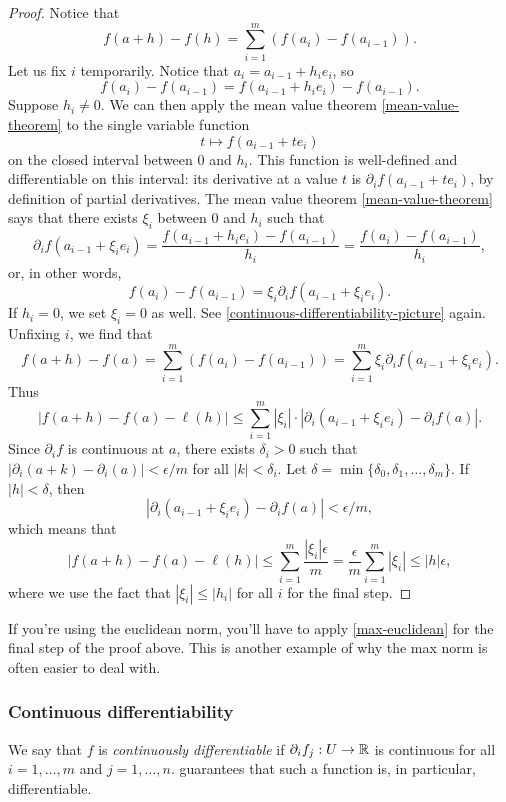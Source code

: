 \begin{proof}[Proof]
	Notice that 
	\[ f(a+h) - f(h) = \sum_{i = 1}^m \left( f(a_i) - f(a_{i-1}) \right). \]
	Let us fix $i$ temporarily. Notice that $a_i = a_{i-1} + h_i e_i$, so
	\[ f(a_i) - f(a_{i-1}) = f(a_{i-1}+h_ie_i) - f(a_{i-1}). \]
	Suppose $h_i \neq 0$. We can then apply the mean value theorem \ref{mean-value-theorem} to the single variable function \[ t \mapsto f(a_{i-1} + te_i) \] on the closed interval between $0$ and $h_i$. This function is well-defined and differentiable on this interval: its derivative at a value $t$ is $\partial_i f(a_{i-1} + te_i)$, by definition of partial derivatives. The mean value theorem \ref{mean-value-theorem} says that there exists $\xi_i$ between 0 and $h_i$ such that
	\[ \partial_i f(a_{i-1} + \xi_ie_i) = \frac{f(a_{i-1} + h_ie_i) - f(a_{i-1})}{h_i} = \frac{f(a_{i}) - f(a_{i-1})}{h_i}, \]
	or, in other words,
	\[ f(a_i) - f(a_{i-1}) = \xi_i \partial_i f(a_{i-1} + \xi_i e_i). \]
	If $h_i = 0$, we set $\xi_i = 0$ as well. 
	See \cref{continuous-differentiability-picture} again. Unfixing $i$, we find that
	\[ f(a+h) - f(a) = \sum_{i = 1}^m (f(a_i) - f(a_{i-1})) = \sum_{i = 1}^m \xi_i \partial_i f(a_{i-1} + \xi_i e_i). \]
	Thus
	\[ |f(a+h) - f(a)-\ell(h)| \leq \sum_{i = 1}^m |\xi_i| \cdot |\partial_i(a_{i-1}+\xi_ie_i) - \partial_if(a)|. \]
	Since $\partial_if$ is continuous at $a$, there exists $\delta_i > 0$ such that $|\partial_i(a+k) - \partial_i(a)| < \epsilon/m$ for all $|k| < \delta_i$. Let $\delta = \min\{\delta_0, \delta_1, \dotsc, \delta_m\}$. If $|h| < \delta$, then 
	\[ |\partial_i(a_{i-1} + \xi_ie_i) - \partial_i f(a)| < \epsilon/m, \]
	which means that
	\[ |f(a+h) - f(a)-\ell(h)| \leq \sum_{i = 1}^m \frac{|\xi_i| \epsilon}{m} = \frac{\epsilon}{m} \sum_{i = 1}^m |\xi_i| \leq |h| \epsilon , \]
	where we use the fact that $|\xi_i| \leq |h_i|$ for all $i$ for the final step. 
\end{proof}

\begin{unimportantremark}
	If you're using the euclidean norm, you'll have to apply \cref{max-euclidean} for the final step of the proof above. This is another example of why the max norm is often easier to deal with. 
\end{unimportantremark}

\subsubsection*{Continuous differentiability}

\begin{definition}  \label{continuously-differentiable-definition}
	We say that $f$ is \emph{continuously differentiable} if $\partial_i f_j : U \to \mathbb{R}$ is continuous for all $i = 1, \dotsc, m$ and $j = 1, \dotsc, n$.  guarantees that such a function is, in particular, differentiable. 
\end{definition}

